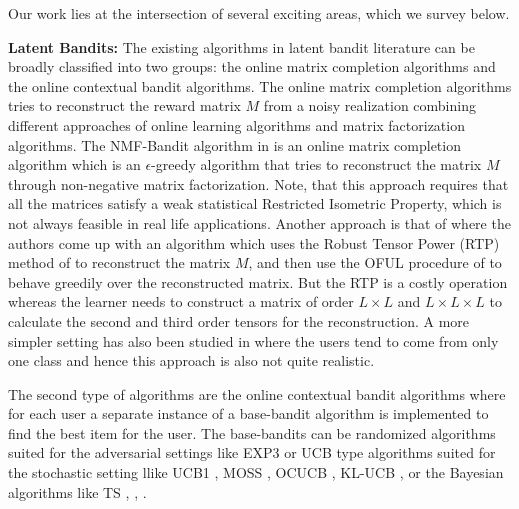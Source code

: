 Our work lies at the intersection of several exciting areas, which we survey below.

\textbf{Latent Bandits:} The existing algorithms in latent bandit literature can be broadly classified into two groups: the online matrix completion algorithms and the online contextual bandit  algorithms. The online matrix completion algorithms tries to reconstruct the reward matrix $M$ from a noisy realization combining different approaches of online learning algorithms and matrix factorization algorithms. The NMF-Bandit algorithm in \citet{sen2016contextual} is an online matrix completion algorithm which is an $\epsilon$-greedy algorithm that tries to reconstruct the matrix $M$ through non-negative matrix factorization. Note, that this approach requires that all the matrices satisfy a weak statistical Restricted Isometric Property, which is not always feasible in real life applications. Another approach is that of \citet{gopalan2016low} where the authors come up with an algorithm which uses the Robust Tensor Power (RTP) method of \citet{anandkumar2014tensor} to reconstruct the matrix $M$, and then use the OFUL procedure of \citet{abbasi2011improved} to behave greedily over the reconstructed matrix. But the RTP is a costly operation whereas the learner needs to construct a matrix of order $L\times L$ and $L\times L \times L$ to calculate the second and third order tensors for the reconstruction.  A more simpler setting has also been studied in \citet{maillard2014latent} where the users tend to come from only one class and hence this approach is also not quite realistic. 

	The second type of algorithms are the online contextual bandit algorithms where for each user a separate instance of a base-bandit algorithm is implemented to find the best item for the user. The base-bandits can be randomized algorithms suited for the adversarial settings like EXP3 \citep{auer2002nonstochastic} or UCB type algorithms suited for the stochastic setting llike UCB1 \citep{auer2002finite}, MOSS \citep{audibert2009minimax}, OCUCB \citep{lattimore2015optimally}, KL-UCB \citep{cappe2013kullback}, \citep{garivier2011kl} or the Bayesian algorithms like TS \citep{thompson1933likelihood}, \citep{thompson1935theory}, \citep{agrawal2012analysis}.


